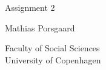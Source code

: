 \begin{titlepage}
    \begin{center}
        \vspace*{1cm}
            
        \Huge
        Assignment 2

            
        \vspace{-1.0cm}
        \LARGE
        
            
        \vspace{1.5cm}
            
        Mathias Porsgaard
            
        \vfill
            
        \vspace{0.8cm}
            
            
        \Large
        Faculty of Social Sciences\\
        University of Copenhagen
            
    \end{center}
\end{titlepage}